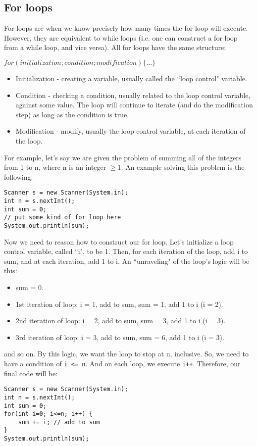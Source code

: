 \subsection{For loops}
For loops are when we know precisely how many times the for loop will execute. However, they are equivalent to while loops (i.e. one can construct a for loop from a while loop, and vice versa). All for loops have the same structure:
\begin{center}
$for(initialization; condition; modification) \{...\}$
\end{center}
\begin{itemize}
\item Initialization - creating a variable, usually called the ``loop control" variable.
\item Condition - checking a condition, usually related to the loop control variable, against some value. The loop will continue to iterate (and do the modification step) as long as the condition is true.
\item Modification - modify, usually the loop control variable, at each iteration of the loop.
\end{itemize}
For example, let's say we are given the problem of summing all of the integers from 1 to n, where n is an integer $\ge 1$. An example solving this problem is the following:
\begin{lstlisting}
Scanner s = new Scanner(System.in);
int n = s.nextInt();
int sum = 0;
// put some kind of for loop here
System.out.println(sum);
\end{lstlisting}
Now we need to reason how to construct our for loop. Let's initialize a loop control variable, called ``i", to be 1. Then, for each iteration of the loop, add i to sum, and at each iteration, add 1 to i. An ``unraveling" of the loop's logic will be this:
\begin{itemize}
\item sum = 0.
\item 1st iteration of loop: i = 1, add to sum, sum = 1, add 1 to i (i = 2).
\item 2nd iteration of loop: i = 2, add to sum, sum = 3, add 1 to i (i = 3).
\item 3rd iteration of loop: i = 3, add to sum, sum = 6, add 1 to i (i = 3).
\end{itemize}
and so on. By this logic, we want the loop to stop at n, inclusive. So, we need to have a condition of \verb|i <= n|. And on each loop, we execute \verb|i++|. Therefore, our final code will be:
\begin{lstlisting}
Scanner s = new Scanner(System.in);
int n = s.nextInt();
int sum = 0;
for(int i=0; i<=n; i++) {
	sum += i; // add to sum
}
System.out.println(sum);
\end{lstlisting}

